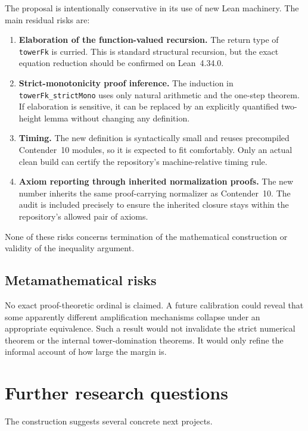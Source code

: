 \documentclass[11pt]{article}
\theoremstyle{definition}
\theoremstyle{remark}
\newcommand{\code}[1]{\texttt{#1}}
\begin{document}
The proposal is intentionally conservative in its use of new Lean machinery.
The main residual risks are:

\begin{enumerate}[leftmargin=*]
\item \textbf{Elaboration of the function-valued recursion.} The return type of
  \code{towerFk} is curried. This is standard structural recursion, but the
  exact equation reduction should be confirmed on Lean~4.34.0.
\item \textbf{Strict-monotonicity proof inference.} The induction in
  \code{towerFk\_strictMono} uses only natural arithmetic and the one-step
  theorem. If elaboration is sensitive, it can be replaced by an explicitly
  quantified two-height lemma without changing any definition.
\item \textbf{Timing.} The new definition is syntactically small and reuses
  precompiled Contender~10 modules, so it is expected to fit comfortably.
  Only an actual clean build can certify the repository's machine-relative
  timing rule.
\item \textbf{Axiom reporting through inherited normalization proofs.} The new
  number inherits the same proof-carrying normalizer as Contender~10. The audit
  is included precisely to ensure the inherited closure stays within the
  repository's allowed pair of axioms.
\end{enumerate}

None of these risks concerns termination of the mathematical construction or
validity of the inequality argument.

\subsection{Metamathematical risks}

No exact proof-theoretic ordinal is claimed. A future calibration could reveal
that some apparently different amplification mechanisms collapse under an
appropriate equivalence. Such a result would not invalidate the strict
numerical theorem or the internal tower-domination theorems. It would only
refine the informal account of how large the margin is.

\section{Further research questions}

The construction suggests several concrete next projects.
\end{document}
